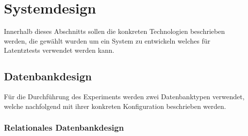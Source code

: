 \chapter{Systemdesign} %
\label{sec:systemdesign}
Innerhalb dieses Abschnitts sollen die konkreten Technologien beschrieben werden, die gewählt wurden um ein System zu entwickeln welches für Latentztests verwendet werden kann.
\section{Datenbankdesign} %
Für die Durchführung des Experiments werden zwei Datenbanktypen verwendet, welche nachfolgend mit ihrer konkreten Konfiguration beschrieben werden.
\label{sec:datenbankdesign}
\subsection{Relationales Datenbankdesign} %
\label{sec:relationalesdatenbankdesign}

